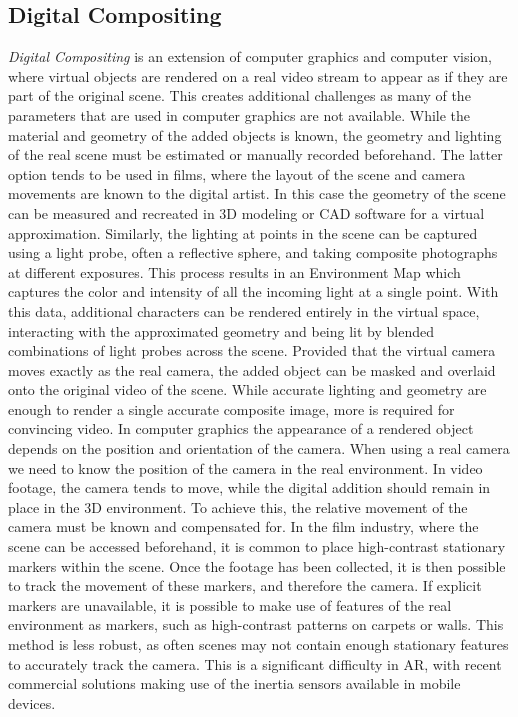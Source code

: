 \documentclass[ %
                    author={Gavin Parker},
                supervisor={Dr. Neill Campbell},
                    degree={MEng},
                     title={Deep Learning for Illumination Estimation from Stereo Images},
                  subtitle={},
                      type={Research},
                      year={2018} ]{dissertation}
\begin{document}
\subsection{Digital Compositing}
\textit{Digital Compositing} is an extension of computer graphics and computer vision, where virtual objects are rendered on a real video stream to appear as if they are part of the original scene. This creates additional challenges as many of the parameters that are used in computer graphics are not available. While the material and geometry of the added objects is known, the geometry and lighting of the real scene must be estimated or manually recorded beforehand. The latter option tends to be used in films, where the layout of the scene and camera movements are known to the digital artist. In this case the geometry of the scene can be measured and recreated in 3D modeling or CAD software for a virtual approximation.
\newline
Similarly, the lighting at points in the scene can be captured using a light probe, often a reflective sphere, and taking composite photographs at different exposures. This process results in an Environment Map which captures the color and intensity of all the incoming light at a single point. With this data, additional characters can be rendered entirely in the virtual space, interacting with the approximated geometry and being lit by blended combinations of light probes across the scene. Provided that the virtual camera moves exactly as the real camera, the added object can be masked and overlaid onto the original video of the scene.
\newline
While accurate lighting and geometry are enough to render a single accurate composite image, more is required for convincing video.  In computer graphics the appearance of a rendered object depends on the position and orientation of the camera. When using a real camera we need to know the position of the camera in the real environment.  In video footage, the camera tends to move, while the digital addition should remain in place in the 3D environment. To achieve this, the relative movement of the camera must be known and compensated for. In the film industry, where the scene can be accessed beforehand, it is common to place high-contrast stationary markers within the scene. Once the footage has been collected, it is then possible to track the movement of these markers, and therefore the camera. If explicit markers are unavailable, it is possible to make use of features of the real environment as markers, such as high-contrast patterns on carpets or walls. This method is less robust, as often scenes may not contain enough stationary features to accurately track the camera. This is a significant difficulty in AR, with recent commercial solutions making use of the inertia sensors available in mobile devices.
\newpage
\end{document}
